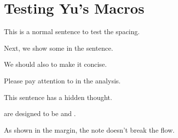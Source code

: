 \usepackage{yu-configs}


\section{Testing Yu's Macros}

This is a normal sentence to test the spacing. 


Next, we show some  in the sentence.

We should also  to make it concise.

Please pay attention to  in the analysis.


This sentence has a hidden thought.

 are designed to be  and  .

As shown in the margin, the note doesn't break the flow.

